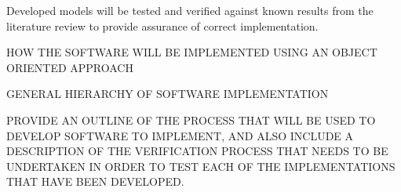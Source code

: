 Developed models will be tested and verified against known results from the literature review to provide assurance of correct implementation.

HOW THE SOFTWARE WILL BE IMPLEMENTED USING AN OBJECT ORIENTED APPROACH

GENERAL HIERARCHY OF SOFTWARE IMPLEMENTATION

PROVIDE AN OUTLINE OF THE PROCESS THAT WILL BE USED TO DEVELOP SOFTWARE TO IMPLEMENT, AND ALSO INCLUDE A DESCRIPTION OF THE VERIFICATION PROCESS THAT NEEDS TO BE UNDERTAKEN IN ORDER TO TEST EACH OF THE IMPLEMENTATIONS THAT HAVE BEEN DEVELOPED.